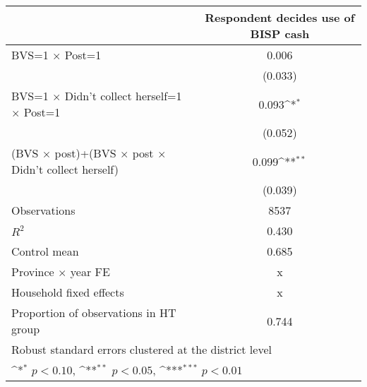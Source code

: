 {
\def\sym#1{\ifmmode^{#1}\else\(^{#1}\)\fi}
\begin{tabular}{l*{1}{c}}
\toprule
                    &\multicolumn{1}{c}{Respondent decides use of BISP cash}\\
\midrule
BVS=1 $\times$ Post=1&       0.006         \\
                    &     (0.033)         \\
\addlinespace
BVS=1 $\times$ Didn't collect herself=1 $\times$ Post=1&       0.093\sym{*}  \\
                    &     (0.052)         \\
\addlinespace
\hline (BVS $\times$ post)+(BVS $\times$  post $\times$ Didn't collect herself)&       0.099\sym{**} \\
                    &     (0.039)         \\
\midrule
Observations        &        8537         \\
\(R^{2}\)           &       0.430         \\
Control mean        &       0.685         \\
Province $\times$  year FE&           x         \\
Household fixed effects&           x         \\
Proportion of observations in HT group&       0.744         \\
\bottomrule
\multicolumn{2}{l}{\footnotesize Robust standard errors clustered at the district level}\\
\multicolumn{2}{l}{\footnotesize \sym{*} \(p<0.10\), \sym{**} \(p<0.05\), \sym{***} \(p<0.01\)}\\
\end{tabular}
}
